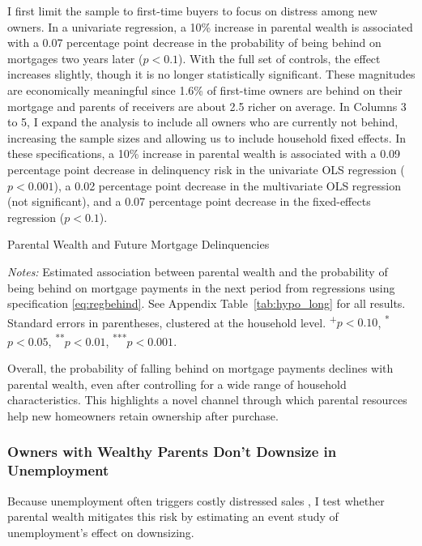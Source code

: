 \documentclass[12pt]{article}
\begin{document}
I first limit the sample to first-time buyers to focus on distress among new owners. In a univariate regression, a 10\% increase in parental wealth is associated with a 0.07 percentage point decrease in the probability of being behind on mortgages two years later ($p<0.1$). With the full set of controls, the effect increases slightly, though it is no longer statistically significant. These magnitudes are economically meaningful since 1.6\% of first-time owners are behind on their mortgage and parents of receivers are about 2.5 richer on average. In Columns 3 to 5, I expand the analysis to include all owners who are currently not behind, increasing the sample sizes and allowing us to include household fixed effects. In these specifications, a 10\% increase in parental wealth is associated with a 0.09 percentage point decrease in delinquency risk in the univariate OLS regression ($p<0.001$), a 0.02 percentage point decrease in the multivariate OLS regression (not significant), and a 0.07 percentage point decrease in the fixed-effects regression ($p<0.1$).

\begin{table}
	\centering
	\begin{threeparttable}
		\caption{Parental Wealth and Future Mortgage Delinquencies}
		\label{tab:hypo}
		\small 
				
	
	\end{threeparttable}
	{\begin{footnotesize}\begin{flushleft}
		\textit{Notes:} Estimated association between parental wealth and the probability of being behind on mortgage payments in the next period from regressions using specification \ref{eq:regbehind}. See Appendix Table~\ref{tab:hypo_long} for all results. Standard errors in parentheses, clustered at the household level. \textsuperscript{+}$p<0.10$, \textsuperscript{*}$p<0.05$, \textsuperscript{**}$p<0.01$, \textsuperscript{***}$p<0.001$.
		\end{flushleft}\end{footnotesize}}	
\end{table}

Overall, the probability of falling behind on mortgage payments declines with parental wealth, even after controlling for a wide range of household characteristics. This highlights a novel channel through which parental resources help new homeowners retain ownership after purchase.


\subsubsection{Owners with Wealthy Parents Don't Downsize in Unemployment}\label{sec:eventstudy}
Because unemployment often triggers costly distressed sales \citep{kermani2021racial,hsu2018unemployment}, I test whether parental wealth mitigates this risk by estimating an event study of unemployment’s effect on downsizing.
\end{document}
